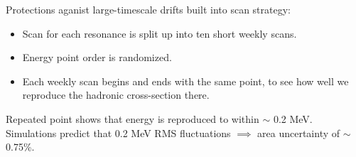 \begin{slide*}

\slideframe{}
\huge
{}

\begin{minipage}[t]{\linewidth}
\Large



Protections aganist large-timescale drifts built into scan strategy:

\begin{center}
\begin{minipage}[t]{12 cm}
\begin{itemize}
  \item Scan for each resonance is split up into ten short weekly scans.

  \item Energy point order is randomized.

  \item Each weekly scan begins and ends with the same point, to see
	how well we reproduce the hadronic cross-section there.

\end{itemize}
\end{minipage}
\end{center}

\vspace{1 cm}

Repeated point shows that energy is reproduced to within $\sim$ 0.2 MeV.
Simulations predict that 0.2 MeV RMS fluctuations $\implies$ area
uncertainty of $\sim$ 0.75\%.
\begin{center}
\end{center}



\end{minipage}
\end{slide*}

